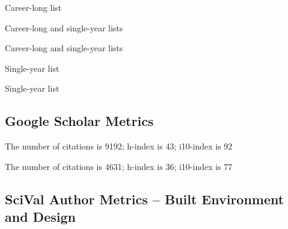 \documentclass[11pt,a4paper]{report} %
\begin{document}
    \begin{tablist}

        \item[2026] \tab{}Career-long list
        
        \item[2025] \tab{}Career-long and single-year lists
        
        \item[2024] \tab{}Career-long and single-year lists

        \item[2023] \tab{}Single-year list
        
        \item[2020] \tab{}Single-year list 
        
    \end{tablist}

    \subsection*{Google Scholar Metrics}

    \begin{tablist}

        \item[Overall] \tab{}The number of citations is 9192; h-index is 43; i10-index is 92

        \item[2021--] \tab{}The number of citations is 4631; h-index is 36; i10-index is 77
        
    \end{tablist}

    \subsection*{SciVal Author Metrics -- Built Environment and Design}
    
\end{document}
